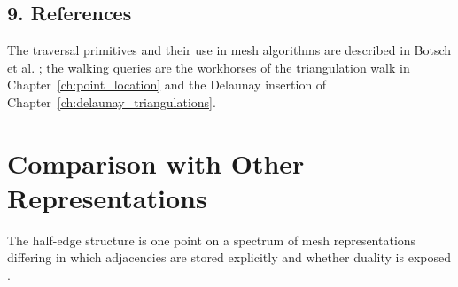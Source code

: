 \subsection{9. References}

The traversal primitives and their use in mesh algorithms are described in
Botsch et al. \cite{botsch2010}; the walking queries are the workhorses of
the triangulation walk in Chapter~\ref{ch:point_location} and the
Delaunay insertion of Chapter~\ref{ch:delaunay_triangulations}.


\section{Comparison with Other Representations}
\label{sec:halfedge_comparison}

The half-edge structure is one point on a spectrum of mesh representations
differing in which adjacencies are stored explicitly and whether duality is
exposed \cite{ericson2004,botsch2010}.

